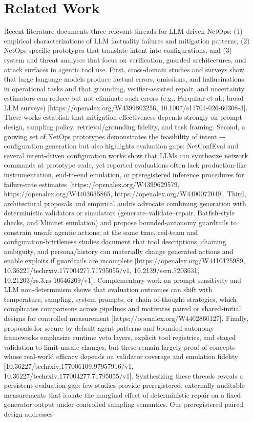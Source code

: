 \documentclass[conference]{IEEEtran}
\begin{document}
\section{Related Work}
Recent literature documents three relevant threads for LLM‑driven NetOps: (1) empirical characterizations of LLM factuality failures and mitigation patterns, (2) NetOps‑specific prototypes that translate intent into configurations, and (3) system and threat analyses that focus on verification, guarded architectures, and attack surfaces in agentic tool use. First, cross‑domain studies and surveys show that large language models produce factual errors, omissions, and hallucinations in operational tasks and that grounding, verifier‑assisted repair, and uncertainty estimators can reduce but not eliminate such errors (e.g., Farquhar et al.; broad LLM surveys) [https://openalex.org/W4399803256, 10.1007/s11704-026-60308-3]. These works establish that mitigation effectiveness depends strongly on prompt design, sampling policy, retrieval/grounding fidelity, and task framing. Second, a growing set of NetOps prototypes demonstrates the feasibility of intent\ensuremath{\rightarrow}configuration generation but also highlights evaluation gaps: NetConfEval and several intent‑driven configuration works show that LLMs can synthesize network commands at prototype scale, yet reported evaluations often lack production‑like instrumentation, end‑to‑end emulation, or preregistered inference procedures for failure‑rate estimates [https://openalex.org/W4399629579, https://openalex.org/W4403635865, https://openalex.org/W4400072049]. Third, architectural proposals and empirical audits advocate combining generation with deterministic validators or simulators (generate--validate--repair, Batfish‑style checks, and Mininet emulation) and propose bounded‑autonomy guardrails to constrain unsafe agentic actions; at the same time, red‑team and configuration‑brittleness studies document that tool descriptions, chaining ambiguity, and persona/history can materially change generated actions and enable exploits if guardrails are incomplete [https://openalex.org/W4410125989, 10.36227/techrxiv.177004277.71795055/v1, 10.2139/ssrn.7203631, 10.21203/rs.3.rs-10646209/v1]. Complementary work on prompt sensitivity and LLM non‑determinism shows that evaluation outcomes can shift with temperature, sampling, system prompts, or chain‑of‑thought strategies, which complicates comparisons across pipelines and motivates paired or shared‑initial designs for controlled measurement [https://openalex.org/W4402860127]. Finally, proposals for secure‑by‑default agent patterns and bounded‑autonomy frameworks emphasize runtime veto layers, explicit tool registries, and staged validation to limit unsafe changes, but these remain largely proof‑of‑concepts whose real‑world efficacy depends on validator coverage and emulation fidelity [10.36227/techrxiv.177006109.97957916/v1, 10.36227/techrxiv.177004277.71795055/v1]. Synthesizing these threads reveals a persistent evaluation gap: few studies provide preregistered, externally auditable measurements that isolate the marginal effect of deterministic repair on a fixed generator output under controlled sampling semantics. Our preregistered paired design addresses 
\end{document}
